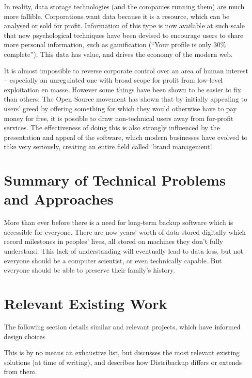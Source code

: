 \documentclass[12pt,a4paper,]{adreport}
\begin{document}
In reality, data storage technologies (and the companies running them)
are much more fallible. Corporations want data because it is a resource,
which can be analysed or sold for profit. Information of this type is
now available at such scale that new psychological techniques have been
devised to encourage users to share more personal information, such as
gamification (``Your profile is only 30\% complete''). This data has
value, and drives the economy of the modern web.

It is almost impossible to reverse corporate control over an area of
human interest -- especially an unregulated one with broad scope for
profit from low-level exploitation en masse. However some things have
been shown to be easier to fix than others. The Open Source movement has
shown that by initially appealing to users' greed by offering something
for which they would otherwise have to pay money for free, it is
possible to draw non-technical users away from for-profit services. The
effectiveness of doing this is also strongly influenced by the
presentation and appeal of the software, which modern businesses have
evolved to take very seriously, creating an entire field called `brand
management'.

\section{Summary of Technical Problems and
Approaches}\label{summary-of-technical-problems-and-approaches}

More than ever before there is a need for long-term backup software
which is accessible for everyone. There are now years' worth of data
stored digitally which record milestones in peoples' lives, all stored
on machines they don't fully understand. This lack of understanding will
eventually lead to data loss, but not everyone should be a computer
scientist, or even technically capable. But everyone should be able to
preserve their family's history.

\section{Relevant Existing Work}\label{relevant-existing-work}

The following section details similar and relevant projects, which have
informed design choices

This is by no means an exhaustive list, but discusses the most relevant
existing solutions (at time of writing), and describes how Distribackup
differs or extends from them.
\end{document}
